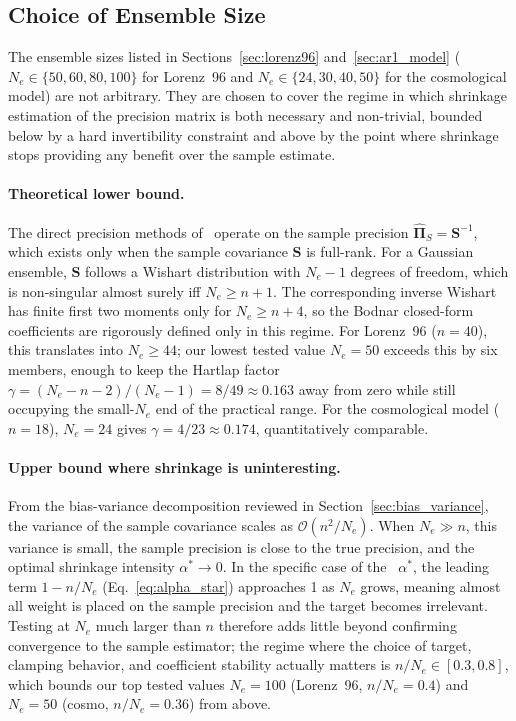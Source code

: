\subsection{Choice of Ensemble Size}
\label{sec:ensemble_size}

The ensemble sizes listed in Sections~\ref{sec:lorenz96} and~\ref{sec:ar1_model} ($N_e \in \{50, 60, 80, 100\}$ for Lorenz~96 and $N_e \in \{24, 30, 40, 50\}$ for the cosmological model) are not arbitrary. They are chosen to cover the regime in which shrinkage estimation of the precision matrix is both necessary and non-trivial, bounded below by a hard invertibility constraint and above by the point where shrinkage stops providing any benefit over the sample estimate.

\paragraph{Theoretical lower bound.}
The direct precision methods of~\citet{bodnar2016direct} operate on the sample precision $\hat{\boldsymbol{\Pi}}_S = \mathbf{S}^{-1}$, which exists only when the sample covariance $\mathbf{S}$ is full-rank. For a Gaussian ensemble, $\mathbf{S}$ follows a Wishart distribution with $N_e - 1$ degrees of freedom, which is non-singular almost surely iff $N_e \geq n + 1$. The corresponding inverse Wishart has finite first two moments only for $N_e \geq n + 4$, so the Bodnar closed-form coefficients are rigorously defined only in this regime. For Lorenz~96 ($n = 40$), this translates into $N_e \geq 44$; our lowest tested value $N_e = 50$ exceeds this by six members, enough to keep the Hartlap factor $\gamma = (N_e - n - 2)/(N_e - 1) = 8/49 \approx 0.163$ away from zero while still occupying the small-$N_e$ end of the practical range. For the cosmological model ($n = 18$), $N_e = 24$ gives $\gamma = 4/23 \approx 0.174$, quantitatively comparable.

\paragraph{Upper bound where shrinkage is uninteresting.}
From the bias-variance decomposition reviewed in Section~\ref{sec:bias_variance}, the variance of the sample covariance scales as $\mathcal{O}(n^2/N_e)$. When $N_e \gg n$, this variance is small, the sample precision is close to the true precision, and the optimal shrinkage intensity $\alpha^* \to 0$. In the specific case of the~\citet{bodnar2016direct} $\alpha^*$, the leading term $1 - n/N_e$ (Eq.~\eqref{eq:alpha_star}) approaches 1 as $N_e$ grows, meaning almost all weight is placed on the sample precision and the target becomes irrelevant. Testing at $N_e$ much larger than $n$ therefore adds little beyond confirming convergence to the sample estimator; the regime where the choice of target, clamping behavior, and coefficient stability actually matters is $n/N_e \in [0.3, 0.8]$, which bounds our top tested values $N_e = 100$ (Lorenz~96, $n/N_e = 0.4$) and $N_e = 50$ (cosmo, $n/N_e = 0.36$) from above.

